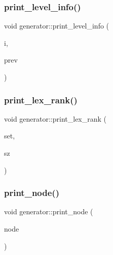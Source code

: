 \subsubsection{\texorpdfstring{print\+\_\+level\+\_\+info()}{print\_level\_info()}}
{\footnotesize\ttfamily void generator\+::print\+\_\+level\+\_\+info (\begin{DoxyParamCaption}\item[{\mbox{\hyperlink{galois_8h_a09fddde158a3a20bd2dcadb609de11dc}{I\+NT}}}]{i,  }\item[{\mbox{\hyperlink{galois_8h_a09fddde158a3a20bd2dcadb609de11dc}{I\+NT}}}]{prev }\end{DoxyParamCaption})}

\mbox{\label{classgenerator_ab89ba2cf2329ea137bcab9b5f38e9595}} 
\subsubsection{\texorpdfstring{print\+\_\+lex\+\_\+rank()}{print\_lex\_rank()}}
{\footnotesize\ttfamily void generator\+::print\+\_\+lex\+\_\+rank (\begin{DoxyParamCaption}\item[{\mbox{\hyperlink{galois_8h_a09fddde158a3a20bd2dcadb609de11dc}{I\+NT}} $\ast$}]{set,  }\item[{\mbox{\hyperlink{galois_8h_a09fddde158a3a20bd2dcadb609de11dc}{I\+NT}}}]{sz }\end{DoxyParamCaption})}

\mbox{\label{classgenerator_a1e3711f29fa53013750b2009e549ba49}} 
\subsubsection{\texorpdfstring{print\+\_\+node()}{print\_node()}}
{\footnotesize\ttfamily void generator\+::print\+\_\+node (\begin{DoxyParamCaption}\item[{\mbox{\hyperlink{galois_8h_a09fddde158a3a20bd2dcadb609de11dc}{I\+NT}}}]{node }\end{DoxyParamCaption})}

\mbox{\label{classgenerator_a9da74456f2e9b3dffb36ca05815bb3da}} 
